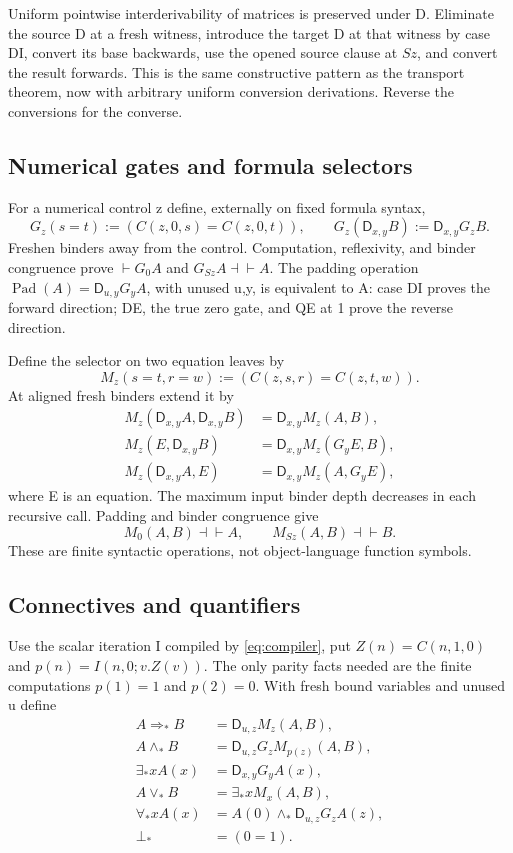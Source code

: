 \documentclass[11pt,letterpaper]{article}
\theoremstyle{definition}\newtheorem{definition}[theorem]{Definition}
\theoremstyle{remark}\newtheorem{remark}[theorem]{Remark}
\newcommand{\D}{\ensuremath{\mathsf D}}
\begin{document}
Uniform pointwise interderivability of matrices is preserved under D.
Eliminate the source D at a fresh witness, introduce the target D at
that witness by case DI, convert its base backwards, use the opened
source clause at $Sz$, and convert the result forwards. This is the
same constructive pattern as the transport theorem, now with arbitrary
uniform conversion derivations. Reverse the conversions for the converse.

\subsection{Numerical gates and formula selectors}

For a numerical control z define, externally on fixed formula syntax,
\[
 G_z(s=t):=(C(z,0,s)=C(z,0,t)),\qquad
 G_z(\D_{x,y}B):=\D_{x,y}G_zB.
\]
Freshen binders away from the control. Computation, reflexivity, and
binder congruence prove $\vdash G_0A$ and $G_{Sz}A\dashv\vdash A$.
The padding operation $\operatorname{Pad}(A)=\D_{u,y}G_yA$, with
unused u,y, is equivalent to A: case DI proves the forward direction;
DE, the true zero gate, and QE at 1 prove the reverse direction.

Define the selector on two equation leaves by
\[
 M_z(s=t,r=w):=(C(z,s,r)=C(z,t,w)).
\]
At aligned fresh binders extend it by
\begin{align*}
 M_z(\D_{x,y}A,\D_{x,y}B)&=\D_{x,y}M_z(A,B),\\
 M_z(E,\D_{x,y}B)&=\D_{x,y}M_z(G_yE,B),\\
 M_z(\D_{x,y}A,E)&=\D_{x,y}M_z(A,G_yE),
\end{align*}
where E is an equation. The maximum input binder depth decreases in
each recursive call. Padding and binder congruence give
\[
             M_0(A,B)\dashv\vdash A,\qquad
             M_{Sz}(A,B)\dashv\vdash B.
\]
These are finite syntactic operations, not object-language function symbols.

\subsection{Connectives and quantifiers}

Use the scalar iteration I compiled by \eqref{eq:compiler}, put
$Z(n)=C(n,1,0)$ and $p(n)=I(n,0;v.Z(v))$. The only parity facts
needed are the finite computations $p(1)=1$ and $p(2)=0$.
With fresh bound variables and unused u define
\begin{align*}
 A\Rightarrow_*B&=\D_{u,z}M_z(A,B),\\
 A\wedge_*B&=\D_{u,z}G_zM_{p(z)}(A,B),\\
 \exists_*x A(x)&=\D_{x,y}G_yA(x),\\
 A\vee_*B&=\exists_*x M_x(A,B),\\
 \forall_*x A(x)&=A(0)\wedge_*\D_{u,z}G_zA(z),\\
 \bot_*&=(0=1).
\end{align*}
\end{document}
